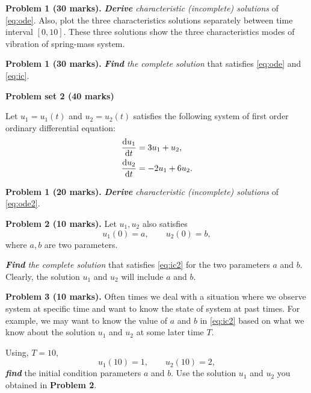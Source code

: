 \documentclass[11pt,a4paper]{report}
\newcommand{\dd}{\mathrm{d}}
\begin{document}
\vspace{10pt}
\noindent\textbf{Problem 1 (30 marks).} \textit{\textbf{Derive} characteristic (incomplete) solutions} of \cref{eq:ode}. Also, plot the three characteristics solutions separately between time interval $[0, 10]$. These three solutions show the three characteristics modes of vibration of spring-mass system.

\vspace{10pt}
\noindent\textbf{Problem 1 (30 marks).} \textit{\textbf{Find} the complete solution} that satisfies \cref{eq:ode} and \cref{eq:ic}.

\begin{center}
\textbf{\Large Problem set 2 (40 marks)}
\end{center}

Let $u_1 = u_1(t)$ and $u_2 = u_2(t)$ satisfies the following system of first order ordinary differential equation:
\begin{align}\label{eq:ode2}
\frac{\dd u_1}{\dd t} &= 3 u_1 + u_2, \notag \\
\frac{\dd u_2}{\dd t} &= -2 u_1 + 6 u_2 .
\end{align}

\vspace{10pt}
\noindent\textbf{Problem 1 (20 marks).} \textit{\textbf{Derive} characteristic (incomplete) solutions} of \cref{eq:ode2}.

\vspace{10pt}
\noindent\textbf{Problem 2 (10 marks).} Let $u_1, u_2$ also satisfies 
\begin{equation}\label{eq:ic2}
u_1(0) = a, \qquad u_2(0) = b,
\end{equation}
where $a, b$ are two parameters. 

\textit{\textbf{Find} the complete solution} that satisfies \cref{eq:ic2} for the two parameters $a$ and $b$. Clearly, the solution $u_1$ and $u_2$ will include $a$ and $b$.

\vspace{10pt}
\noindent\textbf{Problem 3 (10 marks).} Often times we deal with a situation where we observe system at specific time and want to know the state of system at past times. For example, we may want to know the value of $a$ and $b$ in \cref{eq:ic2} based on what we know about the solution $u_1$ and $u_2$ at some later time $T$. 

Using, $T = 10$,
\begin{equation}
u_1(10) = 1, \qquad u_2(10) = 2,
\end{equation}
\textit{\textbf{find} } the initial condition parameters $a$ and $b$. Use the solution $u_1$ and $u_2$ you obtained in \textbf{Problem 2}.
\end{document}
